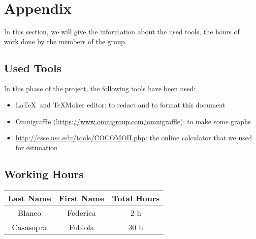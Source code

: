 \section{Appendix} \label{sec:app}
In this section, we will give the information about the used tools, the hours of work done by the members of the group.

\subsection{Used Tools} \label{tools}

In this phase of the project, the following tools have been used:

\begin{itemize}
	\item \LaTeX\ and TeXMaker editor: to redact and to format this document
	\item Omnigraffle (\url{https://www.omnigroup.com/omnigraffle}): to make some graphs
	\item  \url{http://csse.usc.edu/tools/COCOMOII.php}: the online calculator that we used for estimation
\end{itemize}

\subsection{Working Hours} \label{worked}

\begin{table}[htbp]
\begin{center}
\begin{tabular}[t]{ccc}

\hline
\textbf{Last Name} & \textbf{First Name} & \textbf{Total Hours} \\
\hline
Blanco & Federica &  2 h\\
\hline
Casasopra & Fabiola &  30 h\\
\hline

\end{tabular}
\end{center}
\end{table}



